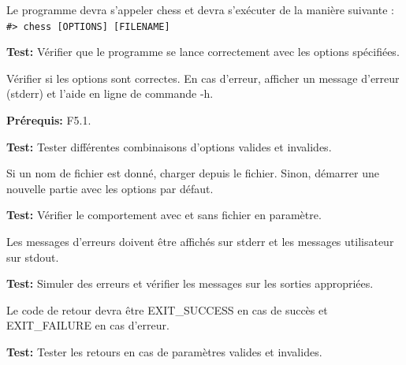 \documentclass{article}
\begin{document}
\begin{needbox}
    \begin{subneedbox}
        Le programme devra s’appeler chess et devra s'exécuter de la manière suivante :  
        \texttt{\#> chess [OPTIONS] [FILENAME]}

        \textbf{Test:} Vérifier que le programme se lance correctement avec les options spécifiées.
    \end{subneedbox}
    
    \begin{subneedbox}
        Vérifier si les options sont correctes. En cas d'erreur, afficher un message d'erreur (stderr) et l’aide en ligne de commande -h.

        \textbf{Prérequis:} F5.1.

        \textbf{Test:} Tester différentes combinaisons d'options valides et invalides.
    \end{subneedbox}
    
    \begin{subneedbox}
        Si un nom de fichier est donné, charger depuis le fichier. Sinon, démarrer une nouvelle partie avec les options par défaut.

        \textbf{Test:} Vérifier le comportement avec et sans fichier en paramètre.
    \end{subneedbox}
    
    \begin{subneedbox}
        Les messages d’erreurs doivent être affichés sur stderr et les messages utilisateur sur stdout.

        \textbf{Test:} Simuler des erreurs et vérifier les messages sur les sorties appropriées.
    \end{subneedbox}
    
    \begin{subneedbox}
        Le code de retour devra être EXIT\_SUCCESS en cas de succès et EXIT\_FAILURE en cas d’erreur.

        \textbf{Test:} Tester les retours en cas de paramètres valides et invalides.
    \end{subneedbox}
\end{needbox}
\end{document}

